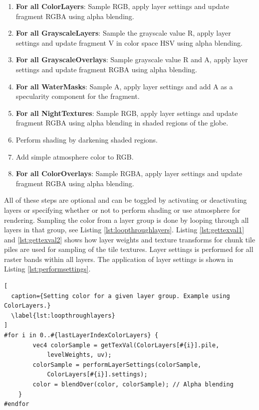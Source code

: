 \begin{enumerate}
\item \textbf{For all ColorLayers}: Sample RGB, apply layer settings and update fragment RGBA using alpha blending.
\item \textbf{For all GrayscaleLayers}: Sample the grayscale value R, apply layer settings and update fragment V in color space HSV using alpha blending.
\item \textbf{For all GrayscaleOverlays}: Sample grayscale value R and A, apply layer settings and update fragment RGBA using alpha blending.
\item \textbf{For all WaterMasks}: Sample A, apply layer settings and add A as a specularity component for the fragment.
\item \textbf{For all NightTextures}: Sample RGB, apply layer settings and update fragment RGBA using alpha blending in shaded regions of the globe.
\item Perform shading by darkening shaded regions.
\item Add simple atmosphere color to RGB.
\item \textbf{For all ColorOverlays}: Sample RGBA, apply layer settings and update fragment RGBA using alpha blending.

\end{enumerate}

All of these steps are optional and can be toggled by activating or deactivating layers or specifying whether or not to perform shading or use atmosphere for rendering. Sampling the color from a layer group is done by looping through all layers in that group, see Listing \ref{lst:loopthroughlayers}. Listing \ref{lst:gettexval1} and \ref{lst:gettexval2} shows how layer weights and texture transforms for chunk tile piles are used for sampling of the tile textures. Layer settings is performed for all raster bands within all layers. The application of layer settings is shown in Listing \ref{lst:performsettings}.

\begin{lstlisting}[
  caption={Setting color for a given layer group. Example using ColorLayers.} 
  \label{lst:loopthroughlayers}
]
#for i in 0..#{lastLayerIndexColorLayers} {
		vec4 colorSample = getTexVal(ColorLayers[#{i}].pile,
			levelWeights, uv);
		colorSample = performLayerSettings(colorSample,
			ColorLayers[#{i}].settings);
		color = blendOver(color, colorSample); // Alpha blending
	}
#endfor
\end{lstlisting}

